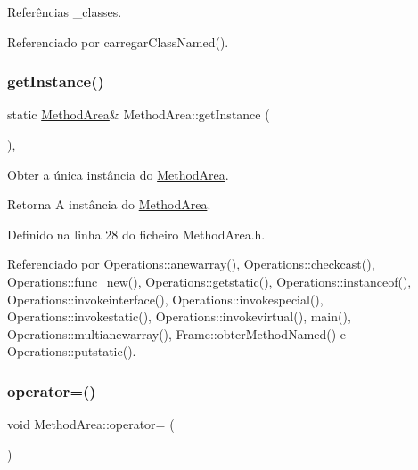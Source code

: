 Referências \+\_\+classes.



Referenciado por carregar\+Class\+Named().

\mbox{\label{classMethodArea_ab5fadec94ada20bc6381e7e9ac766cad}} 
\subsubsection{\texorpdfstring{get\+Instance()}{getInstance()}}
{\footnotesize\ttfamily static \hyperlink{classMethodArea}{Method\+Area}\& Method\+Area\+::get\+Instance (\begin{DoxyParamCaption}{ }\end{DoxyParamCaption})\hspace{0.3cm}{\ttfamily [inline]}, {\ttfamily [static]}}



Obter a única instância do \hyperlink{classMethodArea}{Method\+Area}. 

\begin{DoxyReturn}{Retorna}
A instância do \hyperlink{classMethodArea}{Method\+Area}. 
\end{DoxyReturn}


Definido na linha 28 do ficheiro Method\+Area.\+h.



Referenciado por Operations\+::anewarray(), Operations\+::checkcast(), Operations\+::func\+\_\+new(), Operations\+::getstatic(), Operations\+::instanceof(), Operations\+::invokeinterface(), Operations\+::invokespecial(), Operations\+::invokestatic(), Operations\+::invokevirtual(), main(), Operations\+::multianewarray(), Frame\+::obter\+Method\+Named() e Operations\+::putstatic().

\mbox{\label{classMethodArea_a02652b16a9bc28ceae405a9959cf4ee8}} 
\subsubsection{\texorpdfstring{operator=()}{operator=()}}
{\footnotesize\ttfamily void Method\+Area\+::operator= (\begin{DoxyParamCaption}\item[{\hyperlink{classMethodArea}{Method\+Area} const \&}]{ }\end{DoxyParamCaption})\hspace{0.3cm}{\ttfamily [private]}}



